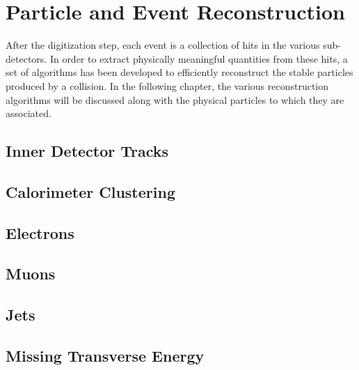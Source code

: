 \chapter{Particle and Event Reconstruction}
\label{chap:reco}

After the digitization step, each event is a collection of hits in the
various sub-detectors. In order to extract physically meaningful
quantities from these hits, a set of algorithms has been developed to 
efficiently reconstruct the stable particles produced by a
collision. In the following chapter, the various reconstruction
algorithms will be discussed along with the physical particles to
which they are associated. 

\section{Inner Detector Tracks}
\label{chap:reco:sec:tracks}


\section{Calorimeter Clustering}
\label{chap:reco:sec:cluster}


\section{Electrons}
\label{chap:reco:sec:electron}


\section{Muons}
\label{chap:reco:sec:muon}


\section{Jets}
\label{chap:reco:sec:jet}


\section{Missing Transverse Energy}
\label{chap:reco:sec:met}

